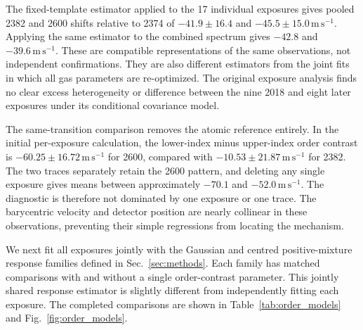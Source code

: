 The fixed-template estimator applied to the 17 individual exposures gives pooled 2382 and 2600 shifts relative to 2374 of $-41.9\pm16.4$ and $-45.5\pm15.0\,\mathrm{m\,s^{-1}}$. Applying the same estimator to the combined spectrum gives $-42.8$ and $-39.6\,\mathrm{m\,s^{-1}}$. These are compatible representations of the same observations, not independent confirmations. They are also different estimators from the joint fits in which all gas parameters are re-optimized. The original exposure analysis finds no clear excess heterogeneity or difference between the nine 2018 and eight later exposures under its conditional covariance model.

The same-transition comparison removes the atomic reference entirely. In the initial per-exposure calculation, the lower-index minus upper-index order contrast is $-60.25\pm16.72\,\mathrm{m\,s^{-1}}$ for 2600, compared with $-10.53\pm21.87\,\mathrm{m\,s^{-1}}$ for 2382. The two traces separately retain the 2600 pattern, and deleting any single exposure gives means between approximately $-70.1$ and $-52.0\,\mathrm{m\,s^{-1}}$. The diagnostic is therefore not dominated by one exposure or one trace. The barycentric velocity and detector position are nearly collinear in these observations, preventing their simple regressions from locating the mechanism.

We next fit all exposures jointly with the Gaussian and centred positive-mixture response families defined in Sec.~\ref{sec:methods}. Each family has matched comparisons with and without a single order-contrast parameter. This jointly shared response estimator is slightly different from independently fitting each exposure. The completed comparisons are shown in Table~\ref{tab:order_models} and Fig.~\ref{fig:order_models}.

